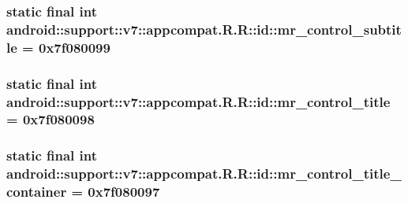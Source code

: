 \hypertarget{classandroid_1_1support_1_1v7_1_1appcompat_1_1_r_1_1id_9ced48c14d3ce42a598bfeb601edea96}{
\subsubsection[{mr\_\-control\_\-subtitle}]{\setlength{\rightskip}{0pt plus 5cm}static final int android::support::v7::appcompat.R.R::id::mr\_\-control\_\-subtitle = 0x7f080099}}
\label{classandroid_1_1support_1_1v7_1_1appcompat_1_1_r_1_1id_9ced48c14d3ce42a598bfeb601edea96}


\hypertarget{classandroid_1_1support_1_1v7_1_1appcompat_1_1_r_1_1id_d2e95d8ef3b7212abc1e46a23a9ea26b}{
\subsubsection[{mr\_\-control\_\-title}]{\setlength{\rightskip}{0pt plus 5cm}static final int android::support::v7::appcompat.R.R::id::mr\_\-control\_\-title = 0x7f080098}}
\label{classandroid_1_1support_1_1v7_1_1appcompat_1_1_r_1_1id_d2e95d8ef3b7212abc1e46a23a9ea26b}


\hypertarget{classandroid_1_1support_1_1v7_1_1appcompat_1_1_r_1_1id_3ca00a82cd7514351e72fe3d6b4afc74}{
\subsubsection[{mr\_\-control\_\-title\_\-container}]{\setlength{\rightskip}{0pt plus 5cm}static final int android::support::v7::appcompat.R.R::id::mr\_\-control\_\-title\_\-container = 0x7f080097}}
\label{classandroid_1_1support_1_1v7_1_1appcompat_1_1_r_1_1id_3ca00a82cd7514351e72fe3d6b4afc74}


